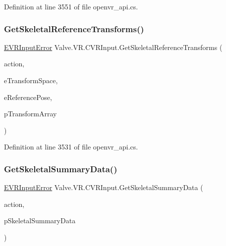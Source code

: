 Definition at line 3551 of file openvr\+\_\+api.\+cs.

\mbox{\label{class_valve_1_1_v_r_1_1_c_v_r_input_a1b8a6482a2ac4a29be8e0186b5d4bbff}} 
\subsubsection{\texorpdfstring{GetSkeletalReferenceTransforms()}{GetSkeletalReferenceTransforms()}}
{\footnotesize\ttfamily \mbox{\hyperlink{namespace_valve_1_1_v_r_a592d7f4189b8346d6c96dbdbaa35bc1b}{E\+V\+R\+Input\+Error}} Valve.\+V\+R.\+C\+V\+R\+Input.\+Get\+Skeletal\+Reference\+Transforms (\begin{DoxyParamCaption}\item[{ulong}]{action,  }\item[{\mbox{\hyperlink{namespace_valve_1_1_v_r_a916744fb3fc7b8e8ba224fba9bee6de4}{E\+V\+R\+Skeletal\+Transform\+Space}}}]{e\+Transform\+Space,  }\item[{\mbox{\hyperlink{namespace_valve_1_1_v_r_a299b655881f873256f035349b59da09e}{E\+V\+R\+Skeletal\+Reference\+Pose}}}]{e\+Reference\+Pose,  }\item[{\mbox{\hyperlink{struct_valve_1_1_v_r_1_1_v_r_bone_transform__t}{V\+R\+Bone\+Transform\+\_\+t}} \mbox{[}$\,$\mbox{]}}]{p\+Transform\+Array }\end{DoxyParamCaption})}



Definition at line 3531 of file openvr\+\_\+api.\+cs.

\mbox{\label{class_valve_1_1_v_r_1_1_c_v_r_input_abbcdcd1fae78cc5c1964624222f3239e}} 
\subsubsection{\texorpdfstring{GetSkeletalSummaryData()}{GetSkeletalSummaryData()}}
{\footnotesize\ttfamily \mbox{\hyperlink{namespace_valve_1_1_v_r_a592d7f4189b8346d6c96dbdbaa35bc1b}{E\+V\+R\+Input\+Error}} Valve.\+V\+R.\+C\+V\+R\+Input.\+Get\+Skeletal\+Summary\+Data (\begin{DoxyParamCaption}\item[{ulong}]{action,  }\item[{ref \mbox{\hyperlink{struct_valve_1_1_v_r_1_1_v_r_skeletal_summary_data__t}{V\+R\+Skeletal\+Summary\+Data\+\_\+t}}}]{p\+Skeletal\+Summary\+Data }\end{DoxyParamCaption})}



